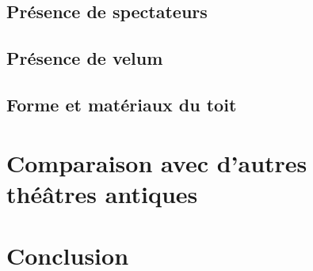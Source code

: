 		\section{Présence de spectateurs}
		\section{Présence de velum}
		\section{Forme et matériaux du toit}
		
		\newpage

	\chapter{Comparaison avec d'autres théâtres antiques}
		\citationChap{
		}{}
		\minitoc
		\newpage
	
	\chapter*{Conclusion}
	
		\newpage
		
 
 
